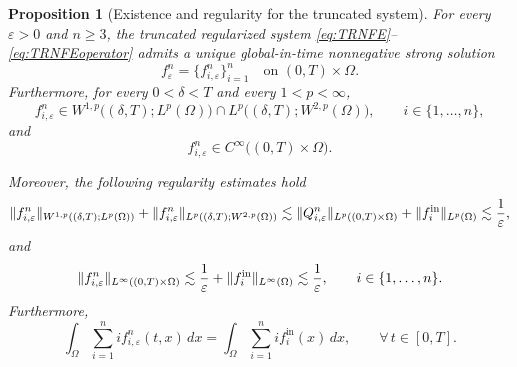 \documentclass[a4paper,12pt,reqno]{amsart}
\theoremstyle{plain}
\newtheorem{prop}[thm]{Proposition}
\numberwithin{equation}{section}
\begin{document}
	\begin{prop}[Existence and regularity for the truncated system]
		\label{prop:existence_truncated}
		For every $\varepsilon>0$ and $n \ge 3$, the truncated regularized system \eqref{eq:TRNFE}--\eqref{eq:TRNFEoperator}
		admits a unique global-in-time nonnegative strong solution
		\[
		f_{\varepsilon}^n = \{f_{i,\varepsilon}^n\}_{i=1}^n
		\quad \text{on } (0,T)\times\Omega.
		\]
		Furthermore, for every $0<\delta<T$ and every $1<p<\infty$, 
		\[
		f_{i,\varepsilon}^n \in
		W^{1,p}\big((\delta,T);L^p(\Omega)\big)
		\cap
		L^p\big((\delta,T);W^{2,p}(\Omega)\big),
		\qquad i\in \{1,\dots,n\},
		\]
		and
		\[
		f_{i,\varepsilon}^n \in C^\infty\big((0,T)\times\Omega\big).
		\]
		
		Moreover, the following regularity estimates hold
		\begin{align} \label{eq: SORE}
			\| f_{i,\varepsilon}^n\|_{W^{1,p}((\delta,T); L^p(\Omega))}+ \| f_{i,\varepsilon}^n\|_{L^p((\delta,T);W^{2,p}(\Omega))} \lesssim   \| Q_{i,\varepsilon}^n\|_{L^p((0,T)\times\Omega)}+ \| f_{i}^{\rm{in}}\|_{L^p(\Omega)} \lesssim  \frac{1}{\varepsilon},
		\end{align}
		and
		\[
		\| f_{i,\varepsilon}^n \|_{L^\infty((0,T)\times\Omega)}
		\lesssim \frac{1}{\varepsilon}+ \| f_i^{\rm{in}}\|_{L^{\infty}(\Omega)} \lesssim \frac{1}{\varepsilon},
		\qquad i\in \{1,\dots,n\}.
		\]
		Furthermore,
		\[
		\int_\Omega \sum_{i=1}^{n} i f_{i,\varepsilon}^n(t,x)\,dx
		=
		\int_\Omega \sum_{i=1}^{n} i f_i^{\mathrm{in}}(x)\,dx,
		\qquad \forall\, t\in[0,T].
		\]
	\end{prop}
\end{document}
